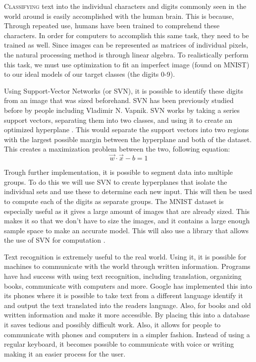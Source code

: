 \lettrine[nindent=0em,lines=3]{C}{lassifying} text into the individual characters and digits commonly seen in the world around is easily accomplished with the human brain. This is because, Through repeated use, humans have been trained to comprehend these characters. In order for computers to accomplish this same task, they need to be trained as well. Since images can be represented as matrices of individual pixels, the natural processing method is through linear algebra. To realistically perform this task, we must use optimization to fit an imperfect image (found on MNIST) to our ideal models of our target classes (the digits 0-9).

Using Support-Vector Networks (or SVN), it is possible to identify these digits from an image that was sized beforehand. SVN has been previously studied before by people including Vladimir N. Vapnik. SVN works by taking a series support vectors, separating them into two classes, and using it to create an optimized hyperplane \cite{statistical-learning}. This would separate the support vectors into two regions with the largest possible margin between the hyperplane and both of the dataset. This creates a maximization problem between the two, following equation:
\begin{equation}
  \vec{w} \cdot \vec{x}-b=1
\end{equation}

Trough further implementation, it is possible to segment data into multiple groups. To do this we will use SVN to create hyperplanes that isolate the individual sets and use these to determine each new input. This will then be used to compute each of the digits as separate groups.  The MNIST dataset is especially useful as it gives a large amount of images that are already sized. This makes it so that we don't have to size the images, and it contains a large enough sample space to make an accurate model. This will also use a library that allows the use of SVN for computation \cite{scikit-learn}.

Text recognition is extremely useful to the real world. Using it, it is possible for machines to communicate with the world through written information. Programs have had success with using text recognition, including translation, organizing books, communicate with computers and more. Google has implemented this into its phones where it is possible to take text from a different language identify it and output the text translated into the readers language. Also, for books and old written information and make it more accessible. By placing this into a database it saves tedious and possibly difficult work. Also, it allows for people to communicate with phones and computers in a simpler fashion. Instead of using a regular keyboard, it becomes possible to communicate with voice or writing making it an easier process for the user.